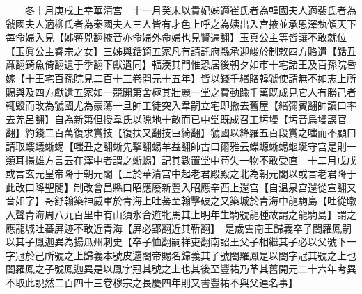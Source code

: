 　　冬十月庚戌上幸華清宫　十一月癸未以貴妃姊適崔氏者為韓國夫人適裴氏者為虢國夫人適柳氏者為秦國夫人三人皆有才色上呼之為姨出入宫掖並承恩澤埶傾天下每命婦入見【姊蒋兕翻掖音亦命婦外命婦也見賢遍翻】玉真公主等皆讓不敢就位【玉眞公主睿宗之女】三姊與銛錡五家凡有請託府縣承迎峻於制敕四方賂遺【銛丑亷翻錡魚倚翻遺于季翻下獻遺同】輻湊其門惟恐居後朝夕如市十宅諸王及百孫院昏嫁【十王宅百孫院見二百十三卷開元十五年】皆以錢千緡賂韓虢使請無不如志上所賜與及四方獻遺五家如一競開第舍極其壯麗一堂之費動踰千萬既成見它人有勝己者輒毁而改為虢國尤為豪蕩一旦帥工徒突入韋嗣立宅即撤去舊屋【緡彌賓翻帥讀曰率去羌呂翻】自為新第但授韋氏以隙地十畝而已中堂既成召工圬墁【圬音烏墁謨官翻】約錢二百萬復求賞技【復扶又翻技巨綺翻】虢國以絳羅五百段賞之嗤而不顧曰請取螻蟻蜥蜴【嗤丑之翻蜥先撃翻蜴羊益翻師古曰爾雅云蠑螈蜥蜴蝘蜒守宫是則一類耳揚雄方言云在澤中者謂之蜥蜴】記其數置堂中苟失一物不敢受直　十二月戊戌或言玄元皇帝降于朝元閣【上於華清宫中起老君殿殿之北為朝元閣以或言老君降于此改曰降聖閣】制改會昌縣曰昭應廢新豐入昭應辛酉上還宫【自温泉宫還從宣翻又音如字】哥舒翰築神威軍於青海上吐蕃至翰擊破之又築城於青海中龍駒島【吐從暾入聲青海周八九百里中有山須氷合遊牝馬其上明年生駒號龍種故謂之龍駒島】謂之應龍城吐蕃屏迹不敢近青海【屏必郢翻近其靳翻】　是歲雲南王歸義卒子閤羅鳳嗣以其子鳳迦異為揚瓜州刺史【卒子恤翻嗣祥吏翻南詔王父子相繼其子必以父號下一字冠於己所號之上歸義本號皮邏閤帝賜名歸義其子號閤羅鳳是以閤字冠其號之上也閤羅鳳之子號鳳迦異是以鳳字冠其號之上也其後至豐祐乃革其舊開元二十六年考異不取此說然二百四十三卷穆宗之長慶四年則又書豐祐不與父連名事】

